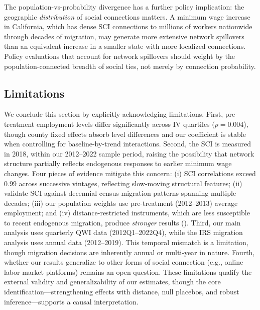 \documentclass[12pt]{article}
\begin{document}
The population-vs-probability divergence has a further policy implication: the geographic \textit{distribution} of social connections matters. A minimum wage increase in California, which has dense SCI connections to millions of workers nationwide through decades of migration, may generate more extensive network spillovers than an equivalent increase in a smaller state with more localized connections. Policy evaluations that account for network spillovers should weight by the population-connected breadth of social ties, not merely by connection probability.

\subsection{Limitations}

We conclude this section by explicitly acknowledging limitations. First, pre-treatment employment levels differ significantly across IV quartiles ($p = 0.004$), though county fixed effects absorb level differences and our coefficient is stable when controlling for baseline-by-trend interactions. Second, the SCI is measured in 2018, within our 2012--2022 sample period, raising the possibility that network structure partially reflects endogenous responses to earlier minimum wage changes. Four pieces of evidence mitigate this concern: (i) SCI correlations exceed 0.99 across successive vintages, reflecting slow-moving structural features; (ii) \citet{bailey2020social} validate SCI against decennial census migration patterns spanning multiple decades; (iii) our population weights use pre-treatment (2012--2013) average employment; and (iv) distance-restricted instruments, which are less susceptible to recent endogenous migration, produce \textit{stronger} results (). Third, our main analysis uses quarterly QWI data (2012Q1--2022Q4), while the IRS migration analysis uses annual data (2012--2019). This temporal mismatch is a limitation, though migration decisions are inherently annual or multi-year in nature. Fourth, whether our results generalize to other forms of social connection (e.g., online labor market platforms) remains an open question. These limitations qualify the external validity and generalizability of our estimates, though the core identification---strengthening effects with distance, null placebos, and robust inference---supports a causal interpretation.


\end{document}

